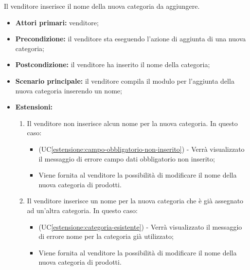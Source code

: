 Il venditore inserisce il nome della nuova categoria da aggiungere.
\begin{itemize}
    \item \textbf{Attori primari:} venditore;
    \item \textbf{Precondizione:} il venditore sta eseguendo l'azione di aggiunta di una nuova categoria;
    \item \textbf{Postcondizione:} il venditore ha inserito il nome della categoria;
    \item \textbf{Scenario principale:} il venditore compila il modulo per l'aggiunta della nuova categoria inserendo un nome;
    \item \textbf{Estensioni:}
    \begin{enumerate}[label=\lett]
    	\item Il venditore non inserisce alcun nome per la nuova categoria. In questo caso:
    	\begin{itemize}
    		\item (UC\ref{estensione:campo-obbligatorio-non-inserito}) - Verrà visualizzato il messaggio di errore campo dati obbligatorio non inserito;
    		\item Viene fornita al venditore la possibilità di modificare il nome della nuova categoria di prodotti.
    	\end{itemize}
    	\item Il venditore inserisce un nome per la nuova categoria che è già assegnato ad un'altra categoria. In questo caso:
    	\begin{itemize}
    		\item (UC\ref{estensione:categoria-esistente}) - Verrà visualizzato il messaggio di errore nome per la categoria già utilizzato;
    		\item Viene fornita al venditore la possibilità di modificare il nome della nuova categoria di prodotti.
    	\end{itemize}
    \end{enumerate}
\end{itemize}

\label{modifica-categoria}

